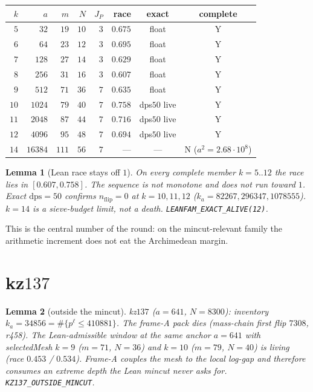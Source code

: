 \documentclass[11pt]{article}
\newtheorem{lemma}{Lemma}
\begin{document}
\begin{center}
\small
\begin{tabular}{@{}rrrrrrcc@{}}
\toprule
$k$ & $a$ & $m$ & $N$ & $J_P$ & race & exact & complete \\
\midrule
$5$  & $32$    & $19$  & $10$ & $3$ & $0.675$ & float & Y \\
$6$  & $64$    & $23$  & $12$ & $3$ & $0.695$ & float & Y \\
$7$  & $128$   & $27$  & $14$ & $3$ & $0.629$ & float & Y \\
$8$  & $256$   & $31$  & $16$ & $3$ & $0.607$ & float & Y \\
$9$  & $512$   & $71$  & $36$ & $7$ & $0.635$ & float & Y \\
$10$ & $1024$  & $79$  & $40$ & $7$ & $0.758$ & dps$50$ live & Y \\
$11$ & $2048$  & $87$  & $44$ & $7$ & $0.716$ & dps$50$ live & Y \\
$12$ & $4096$  & $95$  & $48$ & $7$ & $0.694$ & dps$50$ live & Y \\
$14$ & $16384$ & $111$ & $56$ & $7$ & --- & --- & N ($a^2=2.68\cdot10^8$) \\
\bottomrule
\end{tabular}
\end{center}

\begin{lemma}[Lean race stays off $1$]\label{lem:lean}
On every complete member $k=5..12$
the race lies in $[0.607,0.758]$.
The sequence is not monotone and does
not run toward $1$.
Exact $\mathrm{dps}=50$ confirms
$n_{\mathrm{flip}}=0$ at $k=10,11,12$
($k_a=82267,296347,1078555$).
$k=14$ is a sieve-budget limit, not a
death.  \texttt{LEANFAM\_EXACT\_ALIVE(12)}.
\end{lemma}

This is the central number of the round:
on the mincut-relevant family the
arithmetic increment does not eat the
Archimedean margin.

\section{kz$137$}\label{sec:C}

\begin{lemma}[outside the mincut]\label{lem:137}
kz$137$ ($a=641$, $N=8300$):
inventory $k_a=34856= \#\{p^{\ell}\le 410881\}$.
The frame-A pack dies (mass-chain first
flip $7308$, r458).
The Lean-admissible window at the same
anchor $a=641$ with selectedMesh
$k=9$ ($m=71$, $N=36$) and $k=10$
($m=79$, $N=40$) is living
(race $0.453$ / $0.534$).
Frame-A couples the mesh to the local
log-gap and therefore consumes an
extreme depth the Lean mincut never
asks for.
\texttt{KZ137\_OUTSIDE\_MINCUT}.
\end{lemma}
\end{document}
